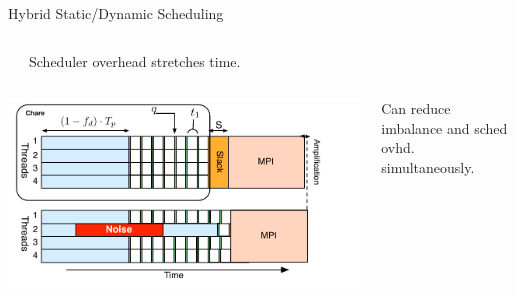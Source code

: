 \begin{frame}[label=hybridstatdyn]{Hybrid Static/Dynamic Scheduling}
\begin{columns}
\begin{center}
  \end{center}
\vspace*{-0.3in}
\begin{center}
{\tiny Scheduler overhead stretches time.}
\end{center}
\end{columns}
\begin{columns}
\vspace*{-0.1in}
%
\begin{center}
\includegraphics[scale=0.31]{images/threadedCompRegion-hybrid.pdf}
\end{center}
\vspace*{-0.3in}
\begin{center}
{\tiny Can reduce imbalance and sched ovhd. simultaneously.}
\end{center}
\end{columns}
\end{frame}


